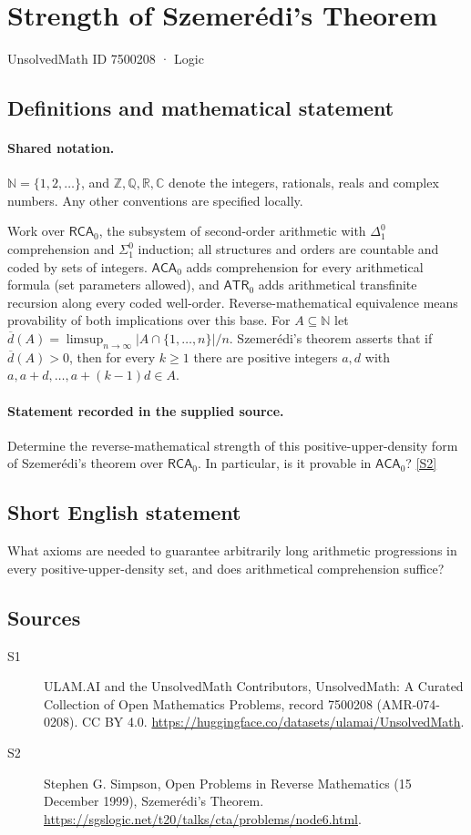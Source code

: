 \documentclass[11pt]{article}
\newcommand{\sref}[2]{\hyperlink{source:#1:#2}{[S#2]}}
\begin{document}
\setcounter{section}{7500207}
\section{Strength of Szemerédi's Theorem}\label{7500208}
{\small\sffamily UnsolvedMath ID 7500208 · Logic}
\subsection{Definitions and mathematical statement}

\paragraph{Shared notation.}$\mathbb N=\{1,2,\ldots\}$, and $\mathbb Z,\mathbb Q,\mathbb R,\mathbb C$ denote the integers, rationals, reals and complex numbers. Any other conventions are specified locally.


Work over $\mathsf{RCA}_0$, the subsystem of second-order arithmetic with $\Delta^0_1$ comprehension and $\Sigma^0_1$ induction; all structures and orders are countable and coded by sets of integers. $\mathsf{ACA}_0$ adds comprehension for every arithmetical formula (set parameters allowed), and $\mathsf{ATR}_0$ adds arithmetical transfinite recursion along every coded well-order. Reverse-mathematical equivalence means provability of both implications over this base. For $A\subseteq\mathbb N$ let $\overline d(A)=\limsup_{n\to\infty}|A\cap\{1,\ldots,n\}|/n$. Szemerédi's theorem asserts that if $\overline d(A)>0$, then for every $k\ge1$ there are positive integers $a,d$ with $a,a+d,\ldots,a+(k-1)d\in A$.
\paragraph{Statement recorded in the supplied source.}
Determine the reverse-mathematical strength of this positive-upper-density form of Szemerédi's theorem over $\mathsf{RCA}_0$. In particular, is it provable in $\mathsf{ACA}_0$? \sref{7500208}{2}
\subsection{Short English statement}
What axioms are needed to guarantee arbitrarily long arithmetic progressions in every positive-upper-density set, and does arithmetical comprehension suffice?
\subsection{Sources}
\begin{description}
\item[\hypertarget{source:7500208:1}{S1}] ULAM.AI and the UnsolvedMath Contributors, UnsolvedMath: A Curated Collection of Open Mathematics Problems, record 7500208 (AMR-074-0208). CC BY 4.0. \url{https://huggingface.co/datasets/ulamai/UnsolvedMath}.
\item[\hypertarget{source:7500208:2}{S2}] Stephen G. Simpson, Open Problems in Reverse Mathematics (15 December 1999), Szemerédi's Theorem. \url{https://sgslogic.net/t20/talks/cta/problems/node6.html}.
\end{description}
\label{end:7500208}
\end{document}

